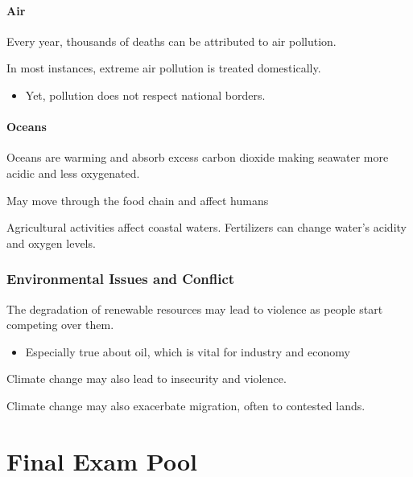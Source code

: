 \documentclass[
]{book}
\providecommand{\tightlist}{%
  \setlength{\itemsep}{0pt}\setlength{\parskip}{0pt}}
\begin{document}
\hypertarget{air}{%
\subsubsection{Air}\label{air}}

Every year, thousands of deaths can be attributed to air pollution.

In most instances, extreme air pollution is treated domestically.

\begin{itemize}
\tightlist
\item
  Yet, pollution does not respect national borders.
\end{itemize}

\hypertarget{oceans}{%
\subsubsection{Oceans}\label{oceans}}

Oceans are warming and absorb excess carbon dioxide making seawater more acidic and less oxygenated.

May move through the food chain and affect humans

Agricultural activities affect coastal waters. Fertilizers can change water's acidity and oxygen levels.

\hypertarget{environmental-issues-and-conflict}{%
\subsection{Environmental Issues and Conflict}\label{environmental-issues-and-conflict}}

The degradation of renewable resources may lead to violence as people start competing over them.

\begin{itemize}
\tightlist
\item
  Especially true about oil, which is vital for industry and economy
\end{itemize}

Climate change may also lead to insecurity and violence.

Climate change may also exacerbate migration, often to contested lands.

\hypertarget{final-exam-pool}{%
\chapter*{Final Exam Pool}\label{final-exam-pool}}
\end{document}
